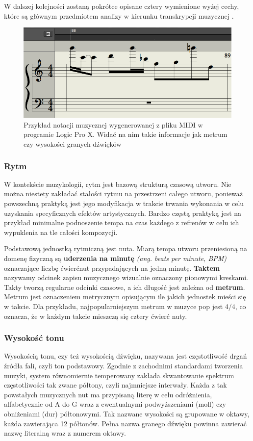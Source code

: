 \documentclass[12pt,a4paper,twoside]{mwart}
\begin{document}
W dalszej kolejności zostaną pokrótce opisane cztery wymienione wyżej cechy, które są głównym przedmiotem analizy w kierunku transkrypcji muzycznej \cite[63]{Homerecording:DlaKazdego}.
\begin{figure}[H]
  \begin{center}
  \includegraphics[scale=0.5]{images/pieciolinia_logic.png}
  \caption{Przykład notacji muzycznej wygenerowanej z pliku MIDI w programie Logic Pro X. Widać na nim takie informacje jak metrum czy wysokości granych dźwięków}
  \end{center}
  \end{figure}
\subsubsection{Rytm}
W kontekście muzykologii, rytm jest bazową strukturą czasową utworu. Nie można niestety zakładać stałości rytmu na przestrzeni całego utworu, ponieważ powszechną praktyką jest jego modyfikacja w trakcie trwania wykonania w celu uzyskania specyficznych efektów artystycznych. Bardzo częstą praktyką jest na przykład minimalne podnoszenie tempa na czas każdego z refrenów w celu ich wypuklenia na tle całości kompozycji.

Podstawową jednostką rytmiczną jest nuta. Miarą tempa utworu przeniesioną na domenę fizyczną są \textbf{uderzenia na minutę} \textit{(ang. beats per minute, BPM)} oznaczające liczbę ćwierćnut przypadających na jedną minutę. \textbf{Taktem} nazywamy odcinek zapisu muzycznego wizualnie oznaczony pionowymi kreskami. Takty tworzą regularne odcinki czasowe, a ich długość jest zależna od \textbf{metrum}. Metrum jest oznaczeniem metrycznym opisującym ile jakich jednostek mieści się w takcie. Dla przykładu, najpopularniejszym metrum w muzyce pop jest 4/4, co oznacza, że w każdym takcie mieszczą się cztery ćwierć nuty.

\subsubsection{Wysokość tonu}
Wysokością tonu, czy też wysokością dźwięku, nazywana jest częstotliwość drgań źródła fali, czyli ton podstawowy. Zgodnie z zachodnimi standardami tworzenia muzyki, system równomiernie temperowany zakłada skwantowanie spektrum częstotliwości tak zwane półtony, czyli najmniejsze interwały. Każda z tak powstałych muzycznych nut ma przypisaną literę w celu odróżnienia, alfabetycznie od A do G wraz z ewentualnymi podwyższeniami (moll) czy obniżeniami (dur) półtonowymi. Tak nazwane wysokości są grupowane w oktawy, każda zawierająca 12 półtonów. Pełna nazwa granego dźwięku powinna zawierać nazwę literalną wraz z numerem oktawy.
\end{document}
